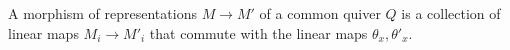 A morphism of representations $M\to M'$ of a common quiver $Q$ is a collection
of linear maps $M_i\to M'_i$ that commute with the linear maps
$\theta_x, \theta'_x$.
